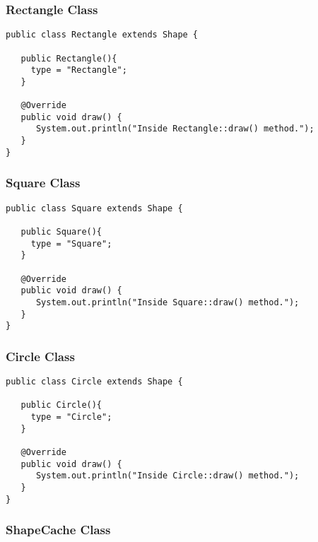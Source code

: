 \subsubsection{Rectangle Class}

\begin{verbatim}
public class Rectangle extends Shape {

   public Rectangle(){
     type = "Rectangle";
   }

   @Override
   public void draw() {
      System.out.println("Inside Rectangle::draw() method.");
   }
}
\end{verbatim}

\subsubsection{Square Class}

\begin{verbatim}
public class Square extends Shape {

   public Square(){
     type = "Square";
   }

   @Override
   public void draw() {
      System.out.println("Inside Square::draw() method.");
   }
}
\end{verbatim}

\subsubsection{Circle Class}

\begin{verbatim}
public class Circle extends Shape {

   public Circle(){
     type = "Circle";
   }

   @Override
   public void draw() {
      System.out.println("Inside Circle::draw() method.");
   }
}
\end{verbatim}

\subsubsection{ShapeCache Class}

